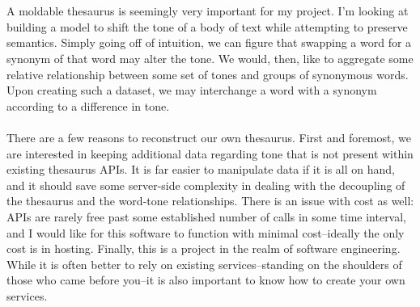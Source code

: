 \documentclass[12pt]{article}
\begin{document}
\noindent

\\


\\

A moldable thesaurus is seemingly very important for my project. I'm looking at building a model to shift the tone of a body of text while attempting to preserve semantics. Simply going off of intuition, we can figure that swapping a word for a synonym of that word may alter the tone. We would, then, like to aggregate some relative relationship between some set of tones and groups of synonymous words. Upon creating such a dataset, we may interchange a word with a synonym according to a difference in tone.\\

\\

There are a few reasons to reconstruct our own thesaurus. First and foremost, we are interested in keeping additional data regarding tone that is not present within existing thesaurus APIs. It is far easier to manipulate data if it is all on hand, and it should save some server-side complexity in dealing with the decoupling of the thesaurus and the word-tone relationships. There is an issue with cost as well: APIs are rarely free past some established number of calls in some time interval, and I would like for this software to function with minimal cost--ideally the only cost is in hosting. Finally, this is a project in the realm of software engineering. While it is often better to rely on existing services--standing on the shoulders of those who came before you--it is also important to know how to create your own services.\\

\\
\end{document}
